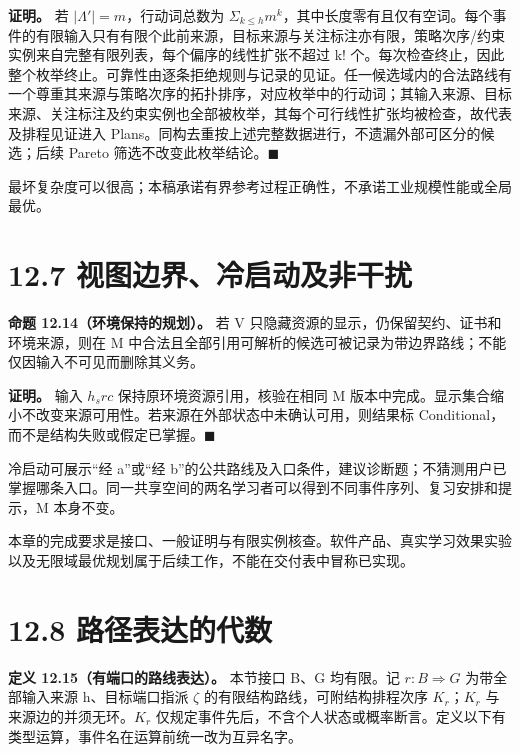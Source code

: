 \documentclass[UTF8,a4paper,zihao=-4,fontset=windows,openany]{ctexbook}
\def\mathrm#1{#1}%
\begin{document}
\textbf{证明。} 若 \(|\Lambda'|=m\)，行动词总数为 \(\Sigma_{k\le h}m^k\)，其中长度零有且仅有空词。每个事件的有限输入只有有限个此前来源，目标来源与关注标注亦有限，策略次序/约束实例来自完整有限列表，每个偏序的线性扩张不超过 k! 个。每次检查终止，因此整个枚举终止。可靠性由逐条拒绝规则与记录的见证。任一候选域内的合法路线有一个尊重其来源与策略次序的拓扑排序，对应枚举中的行动词；其输入来源、目标来源、关注标注及约束实例也全部被枚举，其每个可行线性扩张均被检查，故代表及排程见证进入 Plans。同构去重按上述完整数据进行，不遗漏外部可区分的候选；后续 Pareto 筛选不改变此枚举结论。\(\blacksquare\)

最坏复杂度可以很高；本稿承诺有界参考过程正确性，不承诺工业规模性能或全局最优。

\section{12.7 视图边界、冷启动及非干扰}
\textbf{命题 12.14（环境保持的规划）。} 若 V 只隐藏资源的显示，仍保留契约、证书和环境来源，则在 M 中合法且全部引用可解析的候选可被记录为带边界路线；不能仅因输入不可见而删除其义务。

\textbf{证明。} 输入 \(h_\mathrm{src}\) 保持原环境资源引用，核验在相同 M 版本中完成。显示集合缩小不改变来源可用性。若来源在外部状态中未确认可用，则结果标 Conditional，而不是结构失败或假定已掌握。\(\blacksquare\)

冷启动可展示“经 a”或“经 b”的公共路线及入口条件，建议诊断题；不猜测用户已掌握哪条入口。同一共享空间的两名学习者可以得到不同事件序列、复习安排和提示，M 本身不变。

本章的完成要求是接口、一般证明与有限实例核查。软件产品、真实学习效果实验以及无限域最优规划属于后续工作，不能在交付表中冒称已实现。

\section{12.8 路径表达的代数}
\textbf{定义 12.15（有端口的路线表达）。} 本节接口 B、G 均有限。记 \(r:B\Rightarrow G\) 为带全部输入来源 h、目标端口指派 \(\zeta\) 的有限结构路线，可附结构排程次序 \(K_r\)；\(K_r\) 与来源边的并须无环。\(K_r\) 仅规定事件先后，不含个人状态或概率断言。定义以下有类型运算，事件名在运算前统一改为互异名字。
\end{document}
